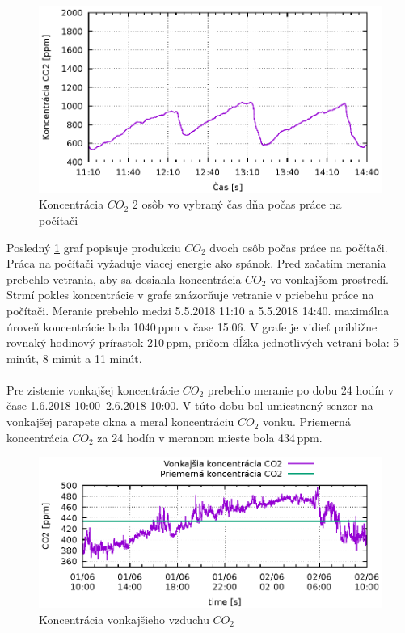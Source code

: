 \begin{figure}[H]
	\centering
	\includegraphics[width=350pt]{images/2ludiaDennaAktivitaCO2.eps} 
	\caption{Koncentrácia $CO_2$ 2 osôb vo vybraný čas dňa počas práce na počítači}
	\label{img2osobyDen}
\end{figure}
Posledný \ref{img2osobyDen} graf popisuje produkciu $CO_2$ dvoch osôb počas práce na počítači. Práca na počítači vyžaduje viacej energie ako spánok. Pred začatím merania prebehlo vetrania, aby sa dosiahla koncentrácia $CO_2$ vo vonkajšom prostredí. Strmí pokles koncentrácie v grafe znázorňuje vetranie v priebehu práce na počítači. Meranie prebehlo medzi 5.5.2018 11:10 a 5.5.2018 14:40. maximálna úroveň koncentrácie bola 1040\,ppm v čase 15:06. V grafe je vidieť približne rovnaký hodinový prírastok 210\,ppm, pričom dĺžka jednotlivých vetraní bola: 5 minút, 8 minút a 11 minút.
\\\\
Pre zistenie vonkajšej koncentrácie $CO_2$ prebehlo meranie po dobu 24 hodín v čase 1.6.2018 10:00--2.6.2018 10:00. V túto dobu bol umiestnený senzor na vonkajšej parapete okna a meral koncentráciu $CO_2$ vonku. Priemerná koncentrácia $CO_2$ za 24 hodín v meranom mieste bola 434\,ppm.

\begin{figure}[H]
	\centering
	\includegraphics[width=420pt]{images/vonkajsieCO2-24h.eps} 
	\caption{Koncentrácia vonkajšieho vzduchu $CO_2$}
	\label{imgPriemernaKoncentracia}
\end{figure}


